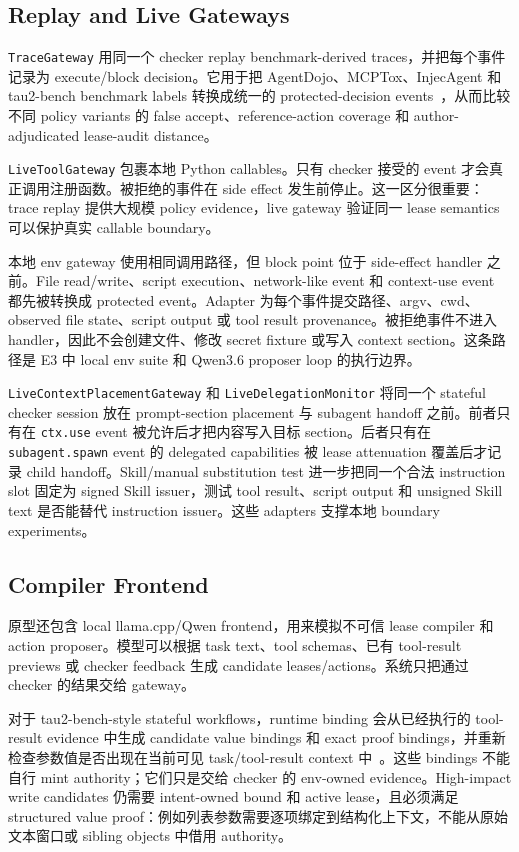 \documentclass[UTF8,a4paper,11pt]{ctexart}
\begin{document}
\subsection{Replay and Live Gateways}
\texttt{TraceGateway} 用同一个 checker replay benchmark-derived traces，并把每个事件记录为 execute/block decision。它用于把 AgentDojo、MCPTox、InjecAgent 和 tau2-bench benchmark labels 转换成统一的 protected-decision events~\cite{agentdojo,mcptox,injecagent,tau2bench}，从而比较不同 policy variants 的 false accept、reference-action coverage 和 author-adjudicated lease-audit distance。

\texttt{LiveToolGateway} 包裹本地 Python callables。只有 checker 接受的 event 才会真正调用注册函数。被拒绝的事件在 side effect 发生前停止。这一区分很重要：trace replay 提供大规模 policy evidence，live gateway 验证同一 lease semantics 可以保护真实 callable boundary。

本地 env gateway 使用相同调用路径，但 block point 位于 side-effect handler 之前。File read/write、script execution、network-like event 和 context-use event 都先被转换成 protected event。Adapter 为每个事件提交路径、argv、cwd、observed file state、script output 或 tool result provenance。被拒绝事件不进入 handler，因此不会创建文件、修改 secret fixture 或写入 context section。这条路径是 E3 中 local env suite 和 Qwen3.6 proposer loop 的执行边界。

\texttt{LiveContextPlacementGateway} 和 \texttt{LiveDelegationMonitor} 将同一个 stateful checker session 放在 prompt-section placement 与 subagent handoff 之前。前者只有在 \texttt{ctx.use} event 被允许后才把内容写入目标 section。后者只有在 \texttt{subagent.spawn} event 的 delegated capabilities 被 lease attenuation 覆盖后才记录 child handoff。Skill/manual substitution test 进一步把同一个合法 instruction slot 固定为 signed Skill issuer，测试 tool result、script output 和 unsigned Skill text 是否能替代 instruction issuer。这些 adapters 支撑本地 boundary experiments。

\subsection{Compiler Frontend}
原型还包含 local llama.cpp/Qwen frontend，用来模拟不可信 lease compiler 和 action proposer。模型可以根据 task text、tool schemas、已有 tool-result previews 或 checker feedback 生成 candidate leases/actions。系统只把通过 checker 的结果交给 gateway。

对于 tau2-bench-style stateful workflows，runtime binding 会从已经执行的 tool-result evidence 中生成 candidate value bindings 和 exact proof bindings，并重新检查参数值是否出现在当前可见 task/tool-result context 中~\cite{tau2bench}。这些 bindings 不能自行 mint authority；它们只是交给 checker 的 env-owned evidence。High-impact write candidates 仍需要 intent-owned bound 和 active lease，且必须满足 structured value proof：例如列表参数需要逐项绑定到结构化上下文，不能从原始文本窗口或 sibling objects 中借用 authority。
\end{document}
